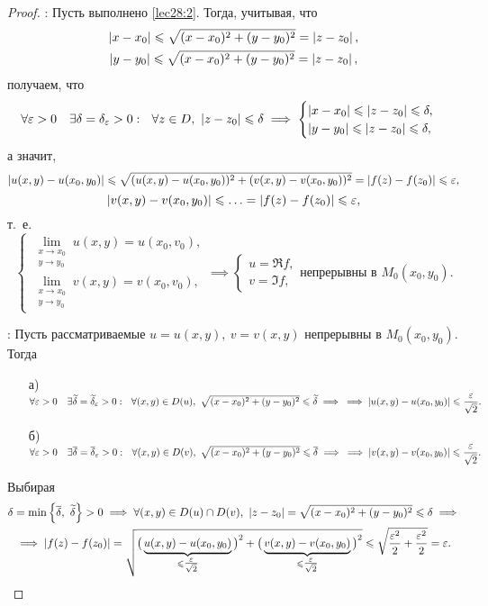 \documentclass[../../main.tex]{subfiles}
\begin{document}
\begin{proof}
	\;
	
	\nec: Пусть выполнено \eqref{lec28:2}. Тогда, учитывая, что
	\[\begin{gathered}
	\left|{x - x_0}\right| \leqslant \sqrt{(x - x_0)^2 + (y - y_0)^2} = \left|{z - z_0}\right|, \\
	\left|{y - y_0}\right| \leqslant \sqrt{(x - x_0)^2 + (y - y_0)^2} = \left|{z - z_0}\right|,
	\end{gathered}\]
	получаем, что
	\[
	\forall \varepsilon > 0 \quad \exists \delta = \delta_{\varepsilon} > 0 : \ \
	\forall z \in D,\ \left|{z - z_0}\right| \leqslant \delta \implies
	\begin{cases}
		\left|{x - x_0}\right| \leqslant \left|{z - z_0}\right| \leqslant \delta, \\
		\left|{y - y_0}\right| \leqslant \left|{z - z_0}\right| \leqslant \delta,
	\end{cases}
	\]
	а значит,
	\[
	\left|{u(x, y) - u(x_0, y_0)}\right| \leqslant
	\sqrt{(u(x, y) - u(x_0, y_0))^2 + (v(x, y) - v(x_0, y_0))^2}
	= \left|{f(z) - f(z_0)}\right| \leqslant \varepsilon,
	\]
	\[
	\left|{v(x, y) - v(x_0, y_0)}\right| \leqslant \ldots = \left|{f(z) - f(z_0)}\right| \leqslant \varepsilon,
	\]
	т.~е.
	\[
	\begin{cases}
		\lim\limits_{\substack{x \to x_0\\y \to y_0}} u(x, y) = u(x_0, v_0), \\
		\lim\limits_{\substack{x \to x_0\\y \to y_0}} v(x, y) = v(x_0, v_0),
	\end{cases}
	\implies
	\begin{cases}
		u = \Re f, \\
		v = \Im f,
	\end{cases}
	\text{непрерывны в }
	M_0(x_0, y_0).
	\]
	
	\suff: Пусть рассматриваемые $u = u(x, y),\ v = v(x, y)$
	непрерывны в $M_0(x_0, y_0)$. Тогда
	\begin{enumerate}
		\item[а)] $\forall \varepsilon > 0 \quad
		\exists \widetilde{\delta} = \widetilde{\delta}_{\varepsilon} > 0 : \ \
		\forall (x, y) \in D(u),\
		\sqrt{(x - x_0)^2 + (y - y_0)^2} \leqslant \widetilde{\delta}
		\implies \\ \implies
		\left|{u(x, y) - u(x_0, y_0)}\right| \leqslant \dfrac{\varepsilon}{\sqrt{2}}.$
		\item[б)] $\forall \eps > 0 \quad
		\exists \overline{\delta} = \overline{\delta}_{\eps} > 0 : \ \
		\forall (x, y) \in D(v),\
		\sqrt{(x - x_0)^2 + (y - y_0)^2} \le \overline{\delta}
		\implies \\ \implies
		\abs{v(x, y) - v(x_0, y_0)} \le \dfrac{\eps}{\sqrt{2}}.$
	\end{enumerate}
	Выбирая
	\[\begin{gathered}
	\delta = \min \left\{\overline{\delta},\ \widetilde{\delta}\right\} > 0
	\implies \forall (x, y) \in D(u) \cap D(v),\
	\left|{z - z_0}\right| =
	\sqrt{(x - x_0)^2 + (y - y_0)^2} \leqslant \delta
	\implies \\ \implies \left|{f(z) - f(z_0)}\right| = \sqrt{
	{\big(\underbrace{u(x, y) - u(x_0, y_0)}_{\leqslant \tfrac{\varepsilon}{\sqrt{2}}}\big)}^2
	+
	{\big(\underbrace{v(x, y) - v(x_0, y_0)}_{\leqslant \tfrac{\varepsilon}{\sqrt{2}}}\big)}^2
	} \leqslant \sqrt{\frac{\varepsilon^2}{2} + \frac{\varepsilon^2}{2}} = \varepsilon.\qedhere
	\end{gathered}\]
\end{proof}
\end{document}
